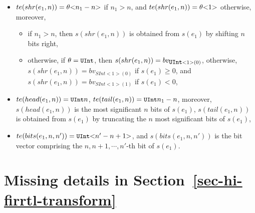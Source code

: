\begin{itemize}
\begin{itemize}
%
\item $te(shr(e_1, n)) = \theta \mbox{<} n_1-n \mbox{>}$ if $n_1 > n$, and $te(shr(e_1, n)) =  \theta \mbox{<} 1 \mbox{>}$ otherwise,  moreover,
\begin{itemize}
\item if $n_1 > n$, then $s(shr(e_1, n))$ is obtained from $s(e_1)$ by shifting $n$ bits right,
%
\item otherwise, if $\theta = \mbox{\prettyll{UInt}}$, then $s(shr(e_1, n))=bv_{\mbox{\prettyll{UInt}}<1>(0)}$, otherwise, $s(shr(e_1, n))=bv_{SInt<1>(0)}$ if $s(e_1) \ge 0$, and $s(shr(e_1, n))=bv_{SInt<1>(1)}$ if $s(e_1) < 0$,
\end{itemize}
%
\item $te(head(e_1, n)) = { \mbox{\prettyll{UInt}}}{n}$, $te(tail(e_1, n)) = { \mbox{\prettyll{UInt}}}{n_1-n}$, moreover, $s(head(e_1, n))$ is the most significant $n$ bits of $s(e_1)$, $s(tail(e_1, n))$ is obtained from $s(e_1)$ by truncating the $n$ most significant bits of $s(e_1)$,
%
\item $te(bits(e_1, n, n')) = \uint{n'-n+1}$, and $s(bits(e_1, n, n'))$ is the bit vector comprising the $n, n+1, \cdots, n'$-th bit of $s(e_1)$.
\end{itemize}
%
\end{itemize}

\section{Missing details in Section~\ref{sec-hi-firrtl-transform}}\label{app-hifirrtl}

